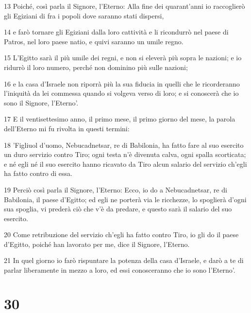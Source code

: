 \par 13 Poiché, così parla il Signore, l'Eterno: Alla fine dei quarant'anni io raccoglierò gli Egiziani di fra i popoli dove saranno stati dispersi,
\par 14 e farò tornare gli Egiziani dalla loro cattività e li ricondurrò nel paese di Patros, nel loro paese natio, e quivi saranno un umile regno.
\par 15 L'Egitto sarà il più umile dei regni, e non si eleverà più sopra le nazioni; e io ridurrò il loro numero, perché non dominino più sulle nazioni;
\par 16 e la casa d'Israele non riporrà più la sua fiducia in quelli che le ricorderanno l'iniquità da lei commessa quando si volgeva verso di loro; e si conoscerà che io sono il Signore, l'Eterno'.
\par 17 E il ventisettesimo anno, il primo mese, il primo giorno del mese, la parola dell'Eterno mi fu rivolta in questi termini:
\par 18 'Figliuol d'uomo, Nebucadnetsar, re di Babilonia, ha fatto fare al suo esercito un duro servizio contro Tiro; ogni testa n'è divenuta calva, ogni spalla scorticata; e né egli né il suo esercito hanno ricavato da Tiro alcun salario del servizio ch'egli ha fatto contro di essa.
\par 19 Perciò così parla il Signore, l'Eterno: Ecco, io do a Nebucadnetsar, re di Babilonia, il paese d'Egitto; ed egli ne porterà via le ricchezze, lo spoglierà d'ogni sua spoglia, vi prederà ciò che v'è da predare, e questo sarà il salario del suo esercito.
\par 20 Come retribuzione del servizio ch'egli ha fatto contro Tiro, io gli do il paese d'Egitto, poiché han lavorato per me, dice il Signore, l'Eterno.
\par 21 In quel giorno io farò rispuntare la potenza della casa d'Israele, e darò a te di parlar liberamente in mezzo a loro, ed essi conosceranno che io sono l'Eterno'.

\chapter{30}

